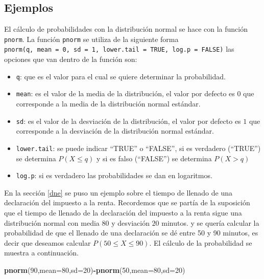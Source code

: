 \documentclass[letterpaper,]{book}
\newenvironment{Shaded}{\begin{snugshade}}{\end{snugshade}}
\newcommand{\DataTypeTok}[1]{\textcolor[rgb]{0.13,0.29,0.53}{#1}}
\newcommand{\DecValTok}[1]{\textcolor[rgb]{0.00,0.00,0.81}{#1}}
\newcommand{\KeywordTok}[1]{\textcolor[rgb]{0.13,0.29,0.53}{\textbf{#1}}}
\newcommand{\NormalTok}[1]{#1}
\newcommand{\OperatorTok}[1]{\textcolor[rgb]{0.81,0.36,0.00}{\textbf{#1}}}
\providecommand{\tightlist}{%
  \setlength{\itemsep}{0pt}\setlength{\parskip}{0pt}}
\begin{document}
\hypertarget{ejemplos}{%
\subsection{Ejemplos}\label{ejemplos}}

El cálculo de probabilidades con la distribución normal se hace con la función \texttt{pnorm}. La función \texttt{pnorm} se utiliza de la siguiente forma \texttt{pnorm(q,\ mean\ =\ 0,\ sd\ =\ 1,\ lower.tail\ =\ TRUE,\ log.p\ =\ FALSE)} las opciones que van dentro de la función son:

\begin{itemize}
\tightlist
\item
  \texttt{q}: que es el valor para el cual se quiere determinar la probabilidad.
\item
  \texttt{mean}: es el valor de la media de la distribución, el valor por defecto es \(0\) que corresponde a la media de la distribución normal estándar.
\item
  \texttt{sd}: es el valor de la desviación de la distribución, el valor por defecto es \(1\) que corresponde a la desviación de la distribución normal estándar.
\item
  \texttt{lower.tail}: se puede indicar ``TRUE'' o ``FALSE'', si es verdadero (``TRUE'') se determina \(P\left(X \leq q \right)\) y si es falso (``FALSE'') se determina \(P\left( X > q \right)\)
\item
  \texttt{log.p}: si es verdadero las probabilidades se dan en logaritmos.
\end{itemize}

En la sección \ref{dne} se puso un ejemplo sobre el tiempo de llenado de una declaración del impuesto a la renta. Recordemos que se partía de la suposición que el tiempo de llenado de la declaración del impuesto a la renta sigue una distribución normal con media \(80\) y desviación \(20\) minutos. y se quería calcular la probabilidad de que el llenado de una declaración se dé entre 50 y 90 minutos, es decir que deseamos calcular \(P\left( 50 \leq X \leq 90 \right)\). El cálculo de la probabilidad se muestra a continuación.

\begin{Shaded}
\begin{Highlighting}[]
\KeywordTok{pnorm}\NormalTok{(}\DecValTok{90}\NormalTok{,}\DataTypeTok{mean=}\DecValTok{80}\NormalTok{,}\DataTypeTok{sd=}\DecValTok{20}\NormalTok{)}\OperatorTok{-}\KeywordTok{pnorm}\NormalTok{(}\DecValTok{50}\NormalTok{,}\DataTypeTok{mean=}\DecValTok{80}\NormalTok{,}\DataTypeTok{sd=}\DecValTok{20}\NormalTok{)}
\end{Highlighting}
\end{Shaded}
\end{document}
